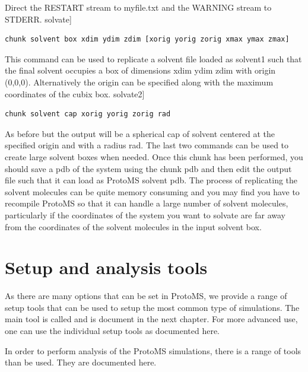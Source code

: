 \documentclass[letterpaper,10pt,english]{sphinxmanual}
\begin{document}
Direct the RESTART stream to myfile.txt and the WARNING stream to STDERR. solvate{]}

\begin{Verbatim}[commandchars=\\\{\}]
chunk solvent box xdim ydim zdim [xorig yorig zorig xmax ymax zmax]
\end{Verbatim}

This command can be used to replicate a solvent file loaded as solvent1 such that the final solvent occupies a box of dimensions xdim ydim zdim with origin (0,0,0). Alternatively the origin can be specified along with the maximum coordinates of the cubix box. solvate2{]}

\begin{Verbatim}[commandchars=\\\{\}]
chunk solvent cap xorig yorig zorig rad
\end{Verbatim}

As before but the output will be a spherical cap of solvent centered at the specified origin and with a radius rad. The last two commands can be used to create large solvent boxes when needed. Once this chunk has been performed, you should save a pdb of the system using the chunk pdb and then edit the output file such that it can load as ProtoMS solvent pdb. The process of replicating the solvent molecules can be quite memory consuming and you may find you have to recompile ProtoMS so that it can handle a large number of solvent molecules, particularly if the coordinates of the system you want to solvate are far away from the coordinates of the solvent molecules in the input solvent box.


\section{Setup and analysis tools}
\label{protoms:setup-and-analysis-tools}
As there are many options that can be set in ProtoMS, we provide a range of setup tools that can be used to setup the most common type of simulations. The main tool is called  and is document in the next chapter. For more advanced use, one can use the individual setup tools as documented here.

In order to perform analysis of the ProtoMS simulations, there is a range of tools than be used. They are documented here.
\end{document}
